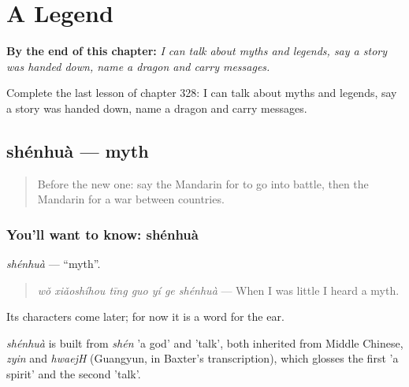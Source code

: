 
\chapter{A Legend}
\label{ch:zh-a-legend}

\begin{chapteropening}
\textbf{By the end of this chapter:} \emph{I can talk about myths and legends, say a story was handed down, name a dragon and carry messages.}

Complete the last lesson of chapter 328: I can talk about myths and legends, say a story was handed down, name a dragon and carry messages.
\end{chapteropening}

\section[shénhuà]{shénhuà — myth}

\label{lesson:ZH-C328-shenhua}



\begin{quote}
Before the new one: say the Mandarin for to go into battle, then the Mandarin for a war between countries.
\end{quote}

\subsection*{You'll want to know: shénhuà}
\emph{shénhuà} — \textquotedblleft{}myth\textquotedblright{}.

\begin{quote}
\emph{wǒ xiǎoshíhou tīng guo yí ge shénhuà} — When I was little I heard a myth.
\end{quote}

Its characters come later; for now it is a word for the ear.

\begin{cousinweb}
\emph{shénhuà} is built from \emph{shén} 'a god' and  'talk', both inherited from Middle Chinese, \emph{zyin} and \emph{hwaejH} (Guangyun, in Baxter's transcription), which glosses the first 'a spirit' and the second 'talk'.
\end{cousinweb}

